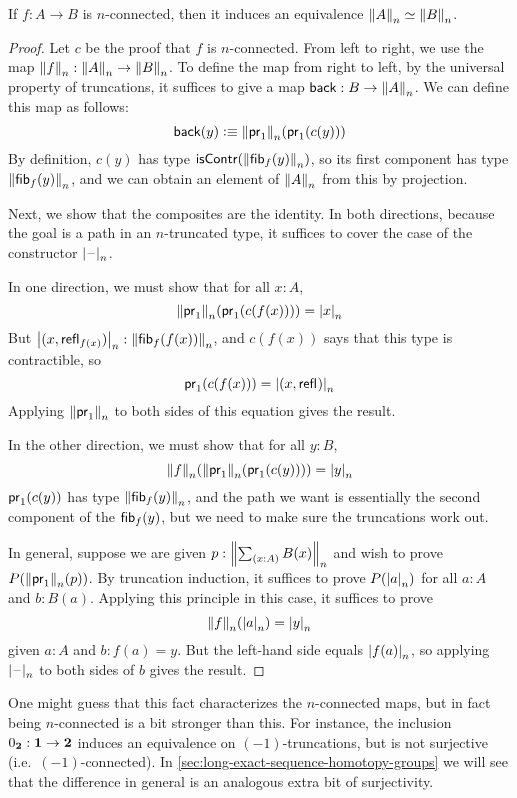 \begin{lem} \label{lem:connected-map-equiv-truncation}
If $f : A \to B$ is $n$-connected, then it induces an equivalence
$\eqv{\trunc{n}{A}}{\trunc{n}{B}}$.
\end{lem}
\begin{proof}
Let $c$ be the proof that $f$ is $n$-connected.  From left to right, we
use the map $\trunc{n}{f} : \trunc{n}{A} \to \trunc{n}{B}$.
To define the map from right to left, by the universal property of
truncations, it suffices to give a map $\mathsf{back} : B \to {\trunc{n}{A}}$.  We can
define this map as follows:
\[
\mathsf{back}(y) \defeq \trunc{n}{\proj{1}}{(\proj{1}{(c(y))})}
\]
By definition, $c(y)$ has type $\iscontr(\trunc n {\hfiber{f}y})$, so its
first component has type $\trunc n{\hfiber{f}y}$, and we can obtain an
element of $\trunc n A$ from this by projection.

Next, we show that the composites are the identity.  In both directions,
because the goal is a path in an $n$-truncated type, it suffices to
cover the case of the constructor $\tprojf{n}$.

In one direction, we must show that for all $x:A$, 
\[
\trunc{n}{\proj{1}}{(\proj{1}{(c(f(x)))})} = \tproj{n}{x}
\]
But $\tproj{n}{(x, \refl{f(x)})} : \trunc n{\hfiber{f}{f(x)}}$, and
$c(f(x))$ says that this type is contractible, so 
\[
\proj{1}{(c(f(x)))} = \tproj{n}{(x, \refl{})}
\]
Applying $\trunc{n}{\proj{1}}$ to both sides of this equation gives the
result.  

In the other direction, we must show that for all $y:B$, 
\[
\trunc{n}{f}(\trunc{n}{\proj{1}} (\proj{1}{(c(y))})) = \tproj{n}{y}
\]
$\proj{1}{(c(y))}$ has type $\trunc n {\hfiber{f}y}$, and the path we
want is essentially the second component of the $\hfiber{f}y$, but we
need to make sure the truncations work out.  

In general, suppose we are given $p:\trunc{n}{\sm{x:A} B(x)}$ and wish to prove
$P(\trunc{n}{\proj{1}{}}(p))$. By truncation induction, it suffices to
prove $P(\tproj{n}{a})$ for all $a:A$ and $b:B(a)$.  Applying this
principle in this case, it suffices to prove
\[
\trunc{n}{f}(\tproj{n}{a}) = \tproj{n}{y}
\]
given $a:A$ and $b:f (a) = y$.  But the left-hand side equals $\tproj{n}{f (a)}$,
so applying $\tprojf{n}$ to both sides of $b$ gives the result.
\end{proof}

One might guess that this fact characterizes the $n$-connected maps, but in fact being $n$-connected is a bit stronger than this.
For instance, the inclusion $\bfalse:\unit \to\bool$ induces an equivalence on $(-1)$-truncations, but is not surjective (i.e.\ $(-1)$-connected).
In \autoref{sec:long-exact-sequence-homotopy-groups} we will see that the difference in general is an analogous extra bit of surjectivity.


